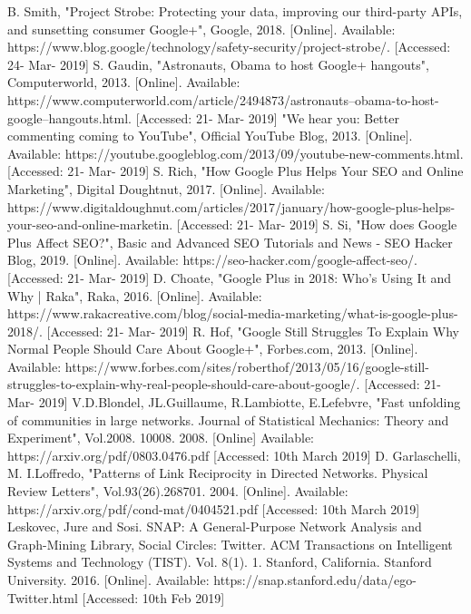 \documentclass[a4paper, 10pt, conference]{ieeeconf}      %
\begin{document}

\begin{thebibliography}{99}

B. Smith, "Project Strobe: Protecting your data, improving our third-party APIs, and sunsetting consumer Google+", Google, 2018. [Online]. Available: https://www.blog.google/technology/safety-security/project-strobe/. [Accessed: 24- Mar- 2019]
S. Gaudin, "Astronauts, Obama to host Google+ hangouts", Computerworld, 2013. [Online]. Available: https://www.computerworld.com/article/2494873/astronauts--obama-to-host-google--hangouts.html. [Accessed: 21- Mar- 2019]
"We hear you: Better commenting coming to YouTube", Official YouTube Blog, 2013. [Online]. Available: https://youtube.googleblog.com/2013/09/youtube-new-comments.html. [Accessed: 21- Mar- 2019]
S. Rich, "How Google Plus Helps Your SEO and Online Marketing", Digital Doughtnut, 2017. [Online]. Available: https://www.digitaldoughnut.com/articles/2017/january/how-google-plus-helps-your-seo-and-online-marketin. [Accessed: 21- Mar- 2019]
S. Si, "How does Google Plus Affect SEO?", Basic and Advanced SEO Tutorials and News - SEO Hacker Blog, 2019. [Online]. Available: https://seo-hacker.com/google-affect-seo/. [Accessed: 21- Mar- 2019]
D. Choate, "Google Plus in 2018: Who's Using It and Why | Raka", Raka, 2016. [Online]. Available: https://www.rakacreative.com/blog/social-media-marketing/what-is-google-plus-2018/. [Accessed: 21- Mar- 2019]
R. Hof, "Google Still Struggles To Explain Why Normal People Should Care About Google+", Forbes.com, 2013. [Online]. Available: https://www.forbes.com/sites/roberthof/2013/05/16/google-still-struggles-to-explain-why-real-people-should-care-about-google/. [Accessed: 21- Mar- 2019]
V.D.Blondel, JL.Guillaume, R.Lambiotte, E.Lefebvre, "Fast unfolding of communities in large networks. Journal of Statistical Mechanics: Theory and Experiment", Vol.2008. 10008. 2008. [Online] Available: https://arxiv.org/pdf/0803.0476.pdf [Accessed: 10th March 2019]
D. Garlaschelli,  M. I.Loffredo,  "Patterns of Link Reciprocity in Directed Networks. Physical Review Letters", Vol.93(26).268701. 2004. [Online]. Available:  https://arxiv.org/pdf/cond-mat/0404521.pdf [Accessed: 10th March 2019]
Leskovec, Jure and Sosi. SNAP: A General-Purpose Network Analysis and Graph-Mining Library, Social Circles: Twitter. ACM Transactions on Intelligent Systems and Technology (TIST). Vol. 8(1). 1. Stanford, California. Stanford University. 2016. [Online]. Available: https://snap.stanford.edu/data/ego-Twitter.html  [Accessed: 10th Feb 2019]

\end{thebibliography}
\end{document}
